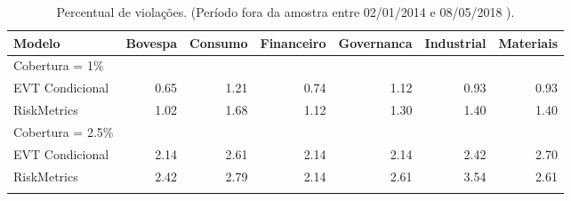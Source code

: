 \begin{longtable}{lrrrrrr}
\caption{Percentual de violações. (Período fora da amostra entre 02/01/2014 e  08/05/2018 ).} \\ 
  \toprule
Modelo & Bovespa & Consumo & Financeiro & Governanca & Industrial & Materiais \\ 
  \midrule
Cobertura = 1\% &  &  &  &  &  &  \\ 
  EVT Condicional & 0.65 & 1.21 & 0.74 & 1.12 & 0.93 & 0.93 \\ 
  RiskMetrics & 1.02 & 1.68 & 1.12 & 1.30 & 1.40 & 1.40 \\ 
  Cobertura = 2.5\% &  &  &  &  &  &  \\ 
  EVT Condicional & 2.14 & 2.61 & 2.14 & 2.14 & 2.42 & 2.70 \\ 
  RiskMetrics & 2.42 & 2.79 & 2.14 & 2.61 & 3.54 & 2.61 \\ 
   \bottomrule
\label{tab:varviol}
\end{longtable}
